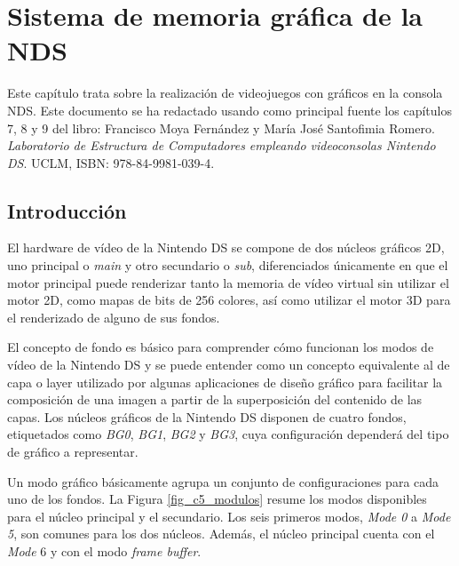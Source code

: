 \chapter{Sistema de memoria gráfica de la NDS}

Este capítulo trata sobre la realización de videojuegos con gráficos en la consola NDS. Este documento se ha redactado usando como principal fuente los capítulos 7, 8 y 9 del libro: Francisco Moya Fernández y María José Santofimia Romero. \textit{Laboratorio de Estructura de Computadores empleando videoconsolas Nintendo DS}. UCLM, ISBN: 978-84-9981-039-4.

\section{Introducción}
El hardware de vídeo de la Nintendo DS se compone de dos núcleos gráficos 2D, uno principal o \textit{main} y otro secundario o \textit{sub}, diferenciados únicamente en que el motor principal puede renderizar tanto la memoria de vídeo virtual sin utilizar el motor 2D, como mapas de bits de 256 colores, así como utilizar el motor 3D para el renderizado de alguno de sus fondos. 

El concepto de fondo es básico para comprender cómo funcionan los modos de vídeo de la Nintendo DS y se puede entender como un concepto equivalente al de capa o layer utilizado por algunas aplicaciones de diseño gráfico para facilitar la composición de una imagen a partir de la superposición del contenido de las capas. Los núcleos gráficos de la Nintendo DS disponen de cuatro fondos, etiquetados como \textit{BG0}, \textit{BG1}, \textit{BG2} y \textit{BG3}, cuya configuración dependerá del tipo de gráfico a representar.

Un modo gráfico básicamente agrupa un conjunto de configuraciones para cada uno de los fondos. La Figura \ref{fig_c5_modulos} resume los modos disponibles para el núcleo principal y el secundario. Los seis primeros modos, \textit{Mode 0} a \textit{Mode 5}, son comunes para los dos núcleos. Además, el núcleo principal cuenta con el \textit{Mode }6 y con el modo \textit{frame buffer}.


